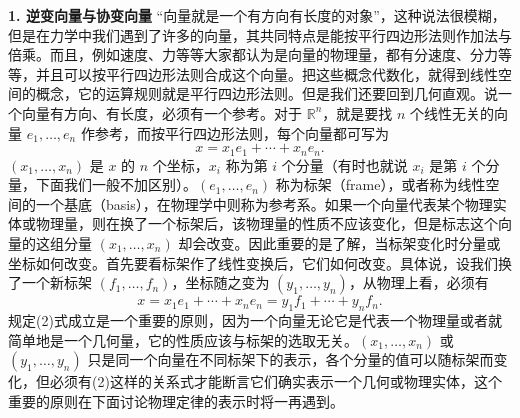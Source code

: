 \noindent\textbf{1. 逆变向量与协变向量}\quad
“向量就是一个有方向有长度的对象”，这种说法很模糊，但是在力学中我们遇到了许多的向量，其共同特点是能按平行四边形法则作加法与倍乘。而且，例如速度、力等等大家都认为是向量的物理量，都有分速度、分力等等，并且可以按平行四边形法则合成这个向量。把这些概念代数化，就得到线性空间的概念，它的运算规则就是平行四边形法则。但是我们还要回到几何直观。说一个向量有方向、有长度，必须有一个参考。对于 $\mathbb R^n$，就是要找 $n$ 个线性无关的向量 $e_1,\ldots,e_n$ 作参考，而按平行四边形法则，每个向量都可写为
\begin{equation}
 x=x_1e_1+\cdots+x_ne_n.
 \tag{1}
\end{equation}
$(x_1,\ldots,x_n)$ 是 $x$ 的 $n$ 个坐标，$x_i$ 称为第 $i$ 个分量（有时也就说 $x_i$ 是第 $i$ 个分量，下面我们一般不加区别）。$(e_1,\ldots,e_n)$ 称为标架（frame），或者称为线性空间的一个基底（basis），在物理学中则称为参考系。如果一个向量代表某个物理实体或物理量，则在换了一个标架后，该物理量的性质不应该变化，但是标志这个向量的这组分量 $(x_1,\ldots,x_n)$ 却会改变。因此重要的是了解，当标架变化时分量或坐标如何改变。首先要看标架作了线性变换后，它们如何改变。具体说，设我们换了一个新标架 $(f_1,\ldots,f_n)$，坐标随之变为 $(y_1,\ldots,y_n)$，从物理上看，必须有
\begin{equation}
 x=x_1e_1+\cdots+x_ne_n=y_1f_1+\cdots+y_nf_n.
 \tag{2}
\end{equation}
规定(2)式成立是一个重要的原则，因为一个向量无论它是代表一个物理量或者就简单地是一个几何量，它的性质应该与标架的选取无关。$(x_1,\ldots,x_n)$ 或 $(y_1,\ldots,y_n)$ 只是同一个向量在不同标架下的表示，各个分量的值可以随标架而变化，但必须有(2)这样的关系式才能断言它们确实表示一个几何或物理实体，这个重要的原则在下面讨论物理定律的表示时将一再遇到。

